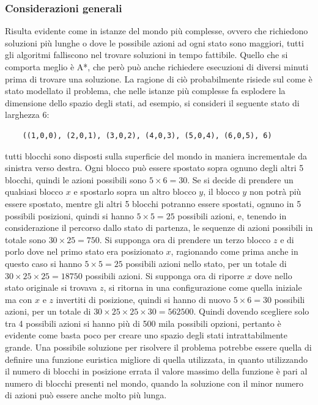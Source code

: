 \documentclass{article}
\begin{document}
	\subsubsection{Considerazioni generali}
	Risulta evidente come in istanze del mondo più complesse, ovvero che richiedono soluzioni più lunghe o dove le possibile azioni ad ogni stato sono maggiori, tutti gli algoritmi falliscono nel trovare soluzioni in tempo fattibile. Quello che si comporta meglio è A*, che però può anche richiedere esecuzioni di diversi minuti prima di trovare una soluzione. La ragione di ciò probabilmente risiede sul come è stato modellato il problema, che nelle istanze più complesse fa esplodere la dimensione dello spazio degli stati, ad esempio, si consideri il seguente stato di larghezza 6:
	\begin{verbatim}
	((1,0,0), (2,0,1), (3,0,2), (4,0,3), (5,0,4), (6,0,5), 6)
	\end{verbatim}
	tutti blocchi sono disposti sulla superficie del mondo in maniera incrementale da sinistra verso destra. Ogni blocco può essere spostato sopra ognuno degli altri 5 blocchi, quindi le azioni possibili sono $5 \times 6 = 30$. Se si decide di prendere un qualsiasi blocco $x$ e spostarlo sopra un altro blocco $y$, il blocco $y$ non potrà più essere spostato, mentre gli altri 5 blocchi potranno essere spostati, ognuno in 5 possibili posizioni, quindi si hanno $5 \times 5 = 25$ possibili azioni, e, tenendo in considerazione il percorso dallo stato di partenza, le sequenze di azioni possibili in totale sono $30 \times 25 = 750$. Si supponga ora di prendere un terzo blocco $z$ e di porlo dove nel primo stato era posizionato $x$, ragionando come prima anche in questo caso si hanno $5 \times 5 = 25$ possibili azioni nello stato, per un totale di $30 \times 25 \times 25 = 18750$ possibili azioni. Si supponga ora di riporre $x$ dove nello stato originale si trovava $z$, si ritorna in una configurazione come quella iniziale ma con $x$ e $z$ invertiti di posizione, quindi si hanno di nuovo $5 \times 6 = 30$ possibili azioni, per un totale di $30 \times 25 \times 25 \times 30 = 562500$. Quindi dovendo scegliere solo tra 4 possibili azioni si hanno più di 500 mila possibili opzioni, pertanto è evidente come basta poco per creare uno spazio degli stati intrattabilmente grande. Una possibile soluzione per risolvere il problema potrebbe essere quella di definire una funzione euristica migliore di quella utilizzata, in quanto utilizzando il numero di blocchi in posizione errata il valore massimo della funzione è pari al numero di blocchi presenti nel mondo, quando la soluzione con il minor numero di azioni può essere anche molto più lunga.
	
\end{document}
